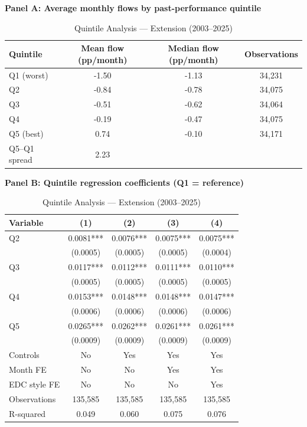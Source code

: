 \documentclass{article}
\begin{document}

\begin{table}[htbp]
\centering
\caption{Quintile Analysis --- Extension (2003--2025)}
\label{tab:quintile-extension}
\small
\begin{threeparttable}

\textbf{Panel A: Average monthly flows by past-performance quintile}

\vspace{0.2cm}

\begin{tabular}{lccc}
\toprule
Quintile & Mean flow (pp/month) & Median flow (pp/month) & Observations \\
\midrule
Q1 (worst) & -1.50 & -1.13 & 34,231 \\
Q2 & -0.84 & -0.78 & 34,075 \\
Q3 & -0.51 & -0.62 & 34,064 \\
Q4 & -0.19 & -0.47 & 34,075 \\
Q5 (best) & 0.74 & -0.10 & 34,171 \\
\midrule
Q5--Q1 spread & 2.23 & & \\
\bottomrule
\end{tabular}

\vspace{0.45cm}

\textbf{Panel B: Quintile regression coefficients (Q1 = reference)}

\vspace{0.2cm}

\begin{tabular}{lcccc}
\toprule
Variable & (1) & (2) & (3) & (4) \\
\midrule
Q2 & 0.0081*** & 0.0076*** & 0.0075*** & 0.0075*** \\
 & (0.0005) & (0.0005) & (0.0005) & (0.0004) \\
Q3 & 0.0117*** & 0.0112*** & 0.0111*** & 0.0110*** \\
 & (0.0005) & (0.0005) & (0.0005) & (0.0005) \\
Q4 & 0.0153*** & 0.0148*** & 0.0148*** & 0.0147*** \\
 & (0.0006) & (0.0006) & (0.0006) & (0.0006) \\
Q5 & 0.0265*** & 0.0262*** & 0.0261*** & 0.0261*** \\
 & (0.0009) & (0.0009) & (0.0009) & (0.0009) \\
\midrule
Controls & No & Yes & Yes & Yes \\
Month FE & No & No & Yes & Yes \\
EDC style FE & No & No & No & Yes \\
Observations & 135,585 & 135,585 & 135,585 & 135,585 \\
R-squared & 0.049 & 0.060 & 0.075 & 0.076 \\
\bottomrule
\end{tabular}


\end{threeparttable}
\end{table}
\end{document}
